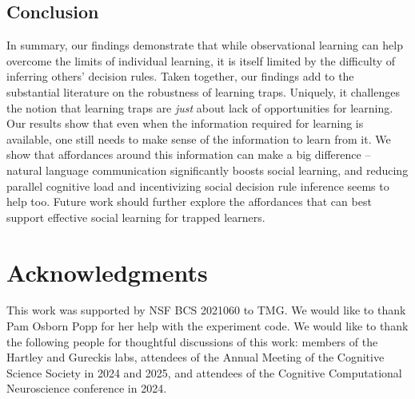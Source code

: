 \documentclass[11pt]{article} %
\begin{document}
\subsection{Conclusion}
In summary, our findings demonstrate that while observational learning can help overcome the limits of individual learning, it is itself limited by the difficulty of inferring others' decision rules. Taken together, our findings add to the substantial literature on the robustness of learning traps. Uniquely, it challenges the notion that learning traps are \emph{just} about lack of opportunities for learning. Our results show that even when the information required for learning is available, one still needs to make sense of the information to learn from it. We show that affordances around this information can make a big difference -- natural language communication significantly boosts social learning, and reducing parallel cognitive load and incentivizing social decision rule inference seems to help too. Future work should further explore the affordances that can best support effective social learning for trapped learners.


\section{Acknowledgments}
This work was supported by NSF BCS 2021060 to TMG. We would like to thank Pam Osborn Popp for her help with the experiment code. We would like to thank the following people for thoughtful discussions of this work: members of the Hartley and Gureckis labs, attendees of the Annual Meeting of the Cognitive Science Society in 2024 and 2025, and attendees of the Cognitive Computational Neuroscience conference in 2024.
\end{document}
